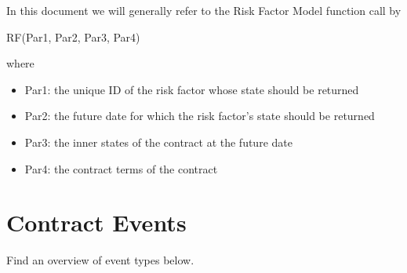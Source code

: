 \documentclass[9pt,oneside]{amsart}
\begin{document}
\begin{multicols}{2}
In this document we will generally refer to the Risk Factor Model function call by\par

RF(Par1, Par2, Par3, Par4)\par

where

\begin{itemize}
	\item Par1: the unique ID of the risk factor whose state should be returned

	\item Par2: the future date for which the risk factor’s state should be returned

	\item Par3: the inner states of the contract at the future date

	\item Par4: the contract terms of the contract
\end{itemize}



\section{Contract Events}\label{sec:events}

Find an overview of event types below.





\end{multicols}
\end{document}
